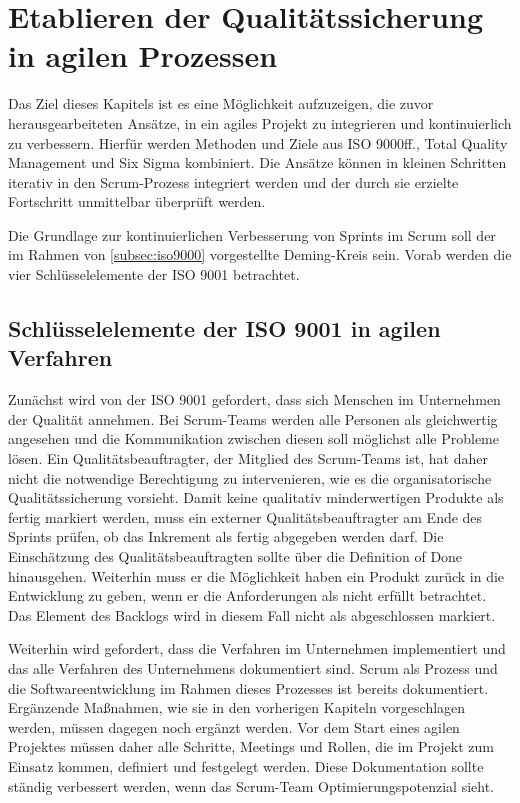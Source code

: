 \chapter{Etablieren der Qualitätssicherung in agilen Prozessen}

    Das Ziel dieses Kapitels ist es eine Möglichkeit aufzuzeigen, die zuvor herausgearbeiteten Ansätze, in ein agiles Projekt zu integrieren und kontinuierlich zu verbessern. Hierfür werden Methoden und Ziele aus ISO 9000ff., Total Quality Management und Six Sigma kombiniert. Die Ansätze können in kleinen Schritten iterativ in den Scrum-Prozess integriert werden und der durch sie erzielte Fortschritt unmittelbar überprüft werden.

    Die Grundlage zur kontinuierlichen Verbesserung von Sprints im Scrum soll der im Rahmen von \autoref{subsec:iso9000} vorgestellte Deming-Kreis sein. Vorab werden die vier Schlüsselelemente der ISO 9001 betrachtet.

    \section{Schlüsselelemente der ISO 9001 in agilen Verfahren}

        Zunächst wird von der ISO 9001 gefordert, dass sich Menschen im Unternehmen der Qualität annehmen. Bei Scrum-Teams werden alle Personen als gleichwertig angesehen und die Kommunikation zwischen diesen soll möglichst alle Probleme lösen. Ein Qualitätsbeauftragter, der Mitglied des Scrum-Teams ist, hat daher nicht die notwendige Berechtigung zu intervenieren, wie es die organisatorische Qualitätssicherung vorsieht. Damit keine qualitativ minderwertigen Produkte als fertig markiert werden, muss ein externer Qualitätsbeauftragter am Ende des Sprints prüfen, ob das Inkrement als fertig abgegeben werden darf. Die Einschätzung des Qualitätsbeauftragten sollte über die Definition of Done hinausgehen. Weiterhin muss er die Möglichkeit haben ein Produkt zurück in die Entwicklung zu geben, wenn er die Anforderungen als nicht erfüllt betrachtet. Das Element des Backlogs wird in diesem Fall nicht als abgeschlossen markiert.

        Weiterhin wird gefordert, dass die Verfahren im Unternehmen implementiert und das alle Verfahren des Unternehmens dokumentiert sind. Scrum als Prozess und die Softwareentwicklung im Rahmen dieses Prozesses ist bereits dokumentiert. Ergänzende Maßnahmen, wie sie in den vorherigen Kapiteln vorgeschlagen werden, müssen dagegen noch ergänzt werden. Vor dem Start eines agilen Projektes müssen daher alle Schritte, Meetings und Rollen, die im Projekt zum Einsatz kommen, definiert und festgelegt werden. Diese Dokumentation sollte ständig verbessert werden, wenn das Scrum-Team Optimierungspotenzial sieht.

